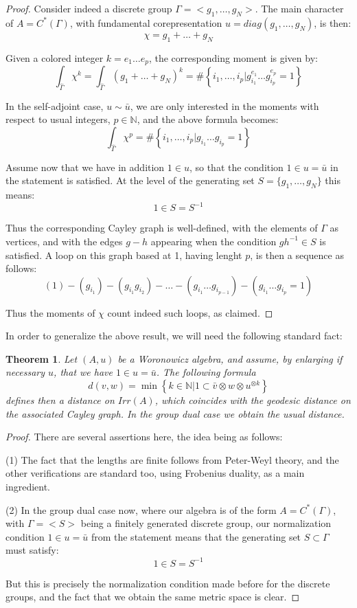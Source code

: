 \documentclass[12pt]{amsbook}
\newtheorem{theorem}{Theorem}[chapter]
\begin{document}
\begin{proof}
Consider indeed a discrete group $\Gamma=<g_1,\ldots,g_N>$. The main character of $A=C^*(\Gamma)$, with fundamental corepresentation $u=diag(g_1,\ldots,g_N)$, is then:
$$\chi=g_1+\ldots+g_N$$

Given a colored integer $k=e_1\ldots e_p$, the corresponding moment is given by:
$$\int_{\widehat{\Gamma}}\chi^k
=\int_{\widehat{\Gamma}}(g_1+\ldots+g_N)^k
=\#\left\{i_1,\ldots,i_p\Big|g_{i_1}^{e_1}\ldots g_{i_p}^{e_p}=1\right\}$$

In the self-adjoint case, $u\sim\bar{u}$, we are only interested in the moments with respect to usual integers, $p\in\mathbb N$, and the above formula becomes:
$$\int_{\widehat{\Gamma}}\chi^p=\#\left\{i_1,\ldots,i_p\Big|g_{i_1}\ldots g_{i_p}=1\right\}$$

Assume now that we have in addition $1\in u$, so that the condition $1\in u=\bar{u}$ in the statement is satisfied. At the level of the generating set $S=\{g_1,\ldots,g_N\}$ this means:
$$1\in S=S^{-1}$$

Thus the corresponding Cayley graph is well-defined, with the elements of $\Gamma$ as vertices, and with the edges $g-h$ appearing when the condition $gh^{-1}\in S$ is satisfied. A loop on this graph based at 1, having lenght $p$, is then a sequence as follows:
$$(1)-(g_{i_1})-(g_{i_1}g_{i_2})-\ldots-(g_{i_1}\ldots g_{i_{p-1}})-(g_{i_1}\ldots g_{i_p}=1)$$

Thus the moments of $\chi$ count indeed such loops, as claimed.
\end{proof}

In order to generalize the above result, we will need the following standard fact:

\begin{theorem}
Let $(A,u)$ be a Woronowicz algebra, and assume, by enlarging if necessary $u$, that we have $1\in u=\bar{u}$. The following formula
$$d(v,w)=\min\left\{k\in\mathbb N\Big|1\subset\bar{v}\otimes w\otimes u^{\otimes k}\right\}$$
defines then a distance on $Irr(A)$, which coincides with the geodesic distance on the associated Cayley graph. In the group dual case we obtain the usual distance.
\end{theorem}

\begin{proof}
There are several assertions here, the idea being as follows:

\medskip

(1) The fact that the lengths are finite follows from Peter-Weyl theory, and the other verifications are standard too, using Frobenius duality, as a main ingredient. 

\medskip

(2) In the group dual case now, where our algebra is of the form $A=C^*(\Gamma)$, with $\Gamma=<S>$ being a finitely generated discrete group, our normalization condition $1\in u=\bar{u}$ from the statement means that the generating set $S\subset\Gamma$ must satisfy:
$$1\in S=S^{-1}$$

But this is precisely the normalization condition made before for the discrete groups, and the fact that we obtain the same metric space is clear.
\end{proof}
\end{document}
